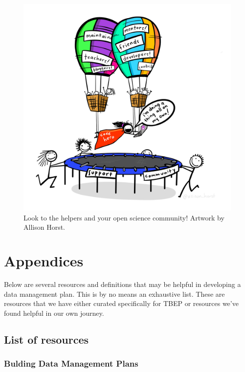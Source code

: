 \documentclass[
]{book}
\begin{document}
\begin{figure}

{\centering \includegraphics[width=1\linewidth]{img/code_hero} 

}

\caption{Look to the helpers and your open science community! Artwork by Allison Horst.}\label{fig:codehero}
\end{figure}

\chapter{Appendices}\label{appendices}

Below are several resources and definitions that may be helpful in developing a data management plan. This is by no means an exhaustive list. These are resources that we have either curated specifically for TBEP or resources we've found helpful in our own journey.

\section{List of resources}\label{list-of-resources}

\subsection{Bulding Data Management Plans}\label{bulding-data-management-plans}
\end{document}
